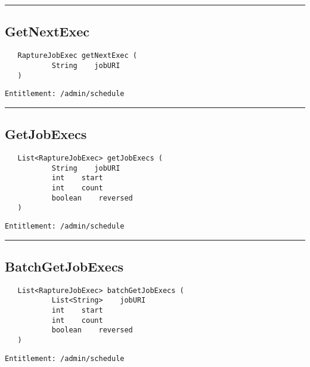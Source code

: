 \rule{12cm}{2pt}
\subsection{GetNextExec}
\label{Api:GetNextExec}
\begin{Verbatim}
   RaptureJobExec getNextExec (
           String    jobURI
   )
\end{Verbatim}
\begin{Verbatim}[formatcom=\color{Maroon}]
  Entitlement: /admin/schedule
\end{Verbatim}



\rule{12cm}{2pt}
\subsection{GetJobExecs}
\label{Api:GetJobExecs}
\begin{Verbatim}
   List<RaptureJobExec> getJobExecs (
           String    jobURI
           int    start
           int    count
           boolean    reversed
   )
\end{Verbatim}
\begin{Verbatim}[formatcom=\color{Maroon}]
  Entitlement: /admin/schedule
\end{Verbatim}



\rule{12cm}{2pt}
\subsection{BatchGetJobExecs}
\label{Api:BatchGetJobExecs}
\begin{Verbatim}
   List<RaptureJobExec> batchGetJobExecs (
           List<String>    jobURI
           int    start
           int    count
           boolean    reversed
   )
\end{Verbatim}
\begin{Verbatim}[formatcom=\color{Maroon}]
  Entitlement: /admin/schedule
\end{Verbatim}



